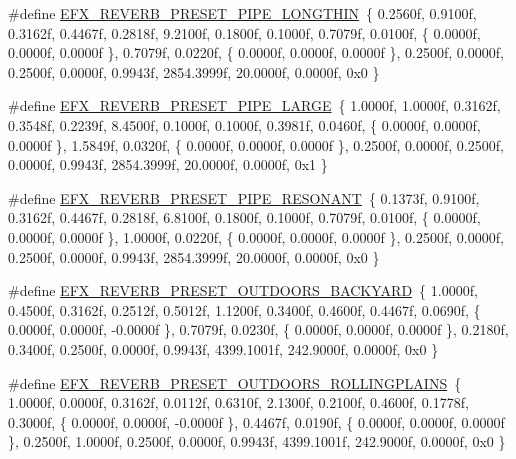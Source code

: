 \begin{DoxyCompactItemize}
\item 
\#define \mbox{\hyperlink{efx-presets_8h_a43dbaaefa9cfb5518b2b4e67149556ce}{E\+F\+X\+\_\+\+R\+E\+V\+E\+R\+B\+\_\+\+P\+R\+E\+S\+E\+T\+\_\+\+P\+I\+P\+E\+\_\+\+L\+O\+N\+G\+T\+H\+IN}}~\{ 0.\+2560f, 0.\+9100f, 0.\+3162f, 0.\+4467f, 0.\+2818f, 9.\+2100f, 0.\+1800f, 0.\+1000f, 0.\+7079f, 0.\+0100f, \{ 0.\+0000f, 0.\+0000f, 0.\+0000f \}, 0.\+7079f, 0.\+0220f, \{ 0.\+0000f, 0.\+0000f, 0.\+0000f \}, 0.\+2500f, 0.\+0000f, 0.\+2500f, 0.\+0000f, 0.\+9943f, 2854.\+3999f, 20.\+0000f, 0.\+0000f, 0x0 \}
\item 
\#define \mbox{\hyperlink{efx-presets_8h_a4e36a870da21838c4ddc94e9bcec4f53}{E\+F\+X\+\_\+\+R\+E\+V\+E\+R\+B\+\_\+\+P\+R\+E\+S\+E\+T\+\_\+\+P\+I\+P\+E\+\_\+\+L\+A\+R\+GE}}~\{ 1.\+0000f, 1.\+0000f, 0.\+3162f, 0.\+3548f, 0.\+2239f, 8.\+4500f, 0.\+1000f, 0.\+1000f, 0.\+3981f, 0.\+0460f, \{ 0.\+0000f, 0.\+0000f, 0.\+0000f \}, 1.\+5849f, 0.\+0320f, \{ 0.\+0000f, 0.\+0000f, 0.\+0000f \}, 0.\+2500f, 0.\+0000f, 0.\+2500f, 0.\+0000f, 0.\+9943f, 2854.\+3999f, 20.\+0000f, 0.\+0000f, 0x1 \}
\item 
\#define \mbox{\hyperlink{efx-presets_8h_af6bed932704e2dc1a1631fdd6393a1c5}{E\+F\+X\+\_\+\+R\+E\+V\+E\+R\+B\+\_\+\+P\+R\+E\+S\+E\+T\+\_\+\+P\+I\+P\+E\+\_\+\+R\+E\+S\+O\+N\+A\+NT}}~\{ 0.\+1373f, 0.\+9100f, 0.\+3162f, 0.\+4467f, 0.\+2818f, 6.\+8100f, 0.\+1800f, 0.\+1000f, 0.\+7079f, 0.\+0100f, \{ 0.\+0000f, 0.\+0000f, 0.\+0000f \}, 1.\+0000f, 0.\+0220f, \{ 0.\+0000f, 0.\+0000f, 0.\+0000f \}, 0.\+2500f, 0.\+0000f, 0.\+2500f, 0.\+0000f, 0.\+9943f, 2854.\+3999f, 20.\+0000f, 0.\+0000f, 0x0 \}
\item 
\#define \mbox{\hyperlink{efx-presets_8h_ae4405742339af8a203fa3d6762b4dd0a}{E\+F\+X\+\_\+\+R\+E\+V\+E\+R\+B\+\_\+\+P\+R\+E\+S\+E\+T\+\_\+\+O\+U\+T\+D\+O\+O\+R\+S\+\_\+\+B\+A\+C\+K\+Y\+A\+RD}}~\{ 1.\+0000f, 0.\+4500f, 0.\+3162f, 0.\+2512f, 0.\+5012f, 1.\+1200f, 0.\+3400f, 0.\+4600f, 0.\+4467f, 0.\+0690f, \{ 0.\+0000f, 0.\+0000f, -\/0.\+0000f \}, 0.\+7079f, 0.\+0230f, \{ 0.\+0000f, 0.\+0000f, 0.\+0000f \}, 0.\+2180f, 0.\+3400f, 0.\+2500f, 0.\+0000f, 0.\+9943f, 4399.\+1001f, 242.\+9000f, 0.\+0000f, 0x0 \}
\item 
\#define \mbox{\hyperlink{efx-presets_8h_a86ac4258810f51d3891fe40f771217e6}{E\+F\+X\+\_\+\+R\+E\+V\+E\+R\+B\+\_\+\+P\+R\+E\+S\+E\+T\+\_\+\+O\+U\+T\+D\+O\+O\+R\+S\+\_\+\+R\+O\+L\+L\+I\+N\+G\+P\+L\+A\+I\+NS}}~\{ 1.\+0000f, 0.\+0000f, 0.\+3162f, 0.\+0112f, 0.\+6310f, 2.\+1300f, 0.\+2100f, 0.\+4600f, 0.\+1778f, 0.\+3000f, \{ 0.\+0000f, 0.\+0000f, -\/0.\+0000f \}, 0.\+4467f, 0.\+0190f, \{ 0.\+0000f, 0.\+0000f, 0.\+0000f \}, 0.\+2500f, 1.\+0000f, 0.\+2500f, 0.\+0000f, 0.\+9943f, 4399.\+1001f, 242.\+9000f, 0.\+0000f, 0x0 \}

\end{DoxyCompactItemize}

